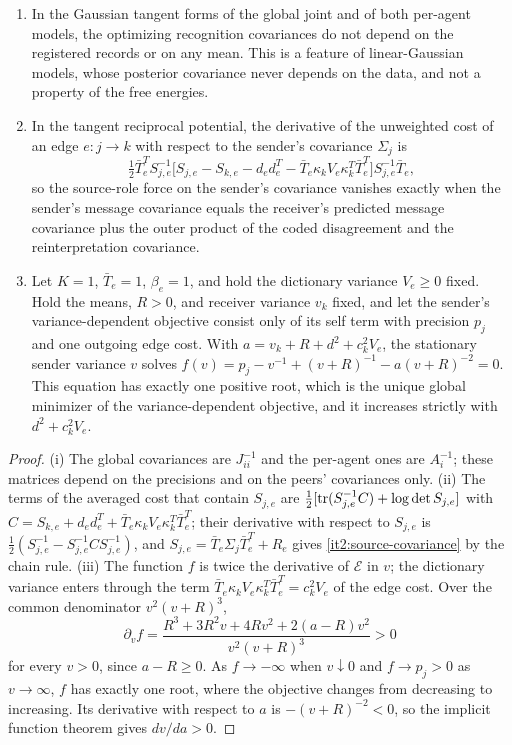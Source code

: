 \begin{enumerate}
\item[(i)] In the Gaussian tangent forms of the global joint and of both per-agent models, the optimizing recognition covariances do not depend on the registered records or on any mean. This is a feature of linear-Gaussian models, whose posterior covariance never depends on the data, and not a property of the free energies.
\item[(ii)] In the tangent reciprocal potential, the derivative of the unweighted cost of an edge $e:j\to k$ with respect to the sender's covariance $\Sigma_j$ is
\begin{equation}
\tfrac12\bar T_e^TS_{j,e}^{-1}\bigl[S_{j,e}-S_{k,e}-d_ed_e^T-\bar T_e\kappa_kV_e\kappa_k^T\bar T_e^T\bigr]S_{j,e}^{-1}\bar T_e,
\label{it2:source-covariance}
\end{equation}
so the source-role force on the sender's covariance vanishes exactly when the sender's message covariance equals the receiver's predicted message covariance plus the outer product of the coded disagreement and the reinterpretation covariance.
\item[(iii)] Let $K=1$, $\bar T_e=1$, $\beta_e=1$, and hold the dictionary variance $V_e\geq0$ fixed. Hold the means, $R>0$, and receiver variance $v_k$ fixed, and let the sender's variance-dependent objective consist only of its self term with precision $p_j$ and one outgoing edge cost. With $a=v_k+R+d^2+c_k^2V_e$, the stationary sender variance $v$ solves $f(v)=p_j-v^{-1}+(v+R)^{-1}-a(v+R)^{-2}=0$. This equation has exactly one positive root, which is the unique global minimizer of the variance-dependent objective, and it increases strictly with $d^2+c_k^2V_e$.
\end{enumerate}
\begin{proof}
(i) The global covariances are $J_{ii}^{-1}$ and the per-agent ones are $A_i^{-1}$; these matrices depend on the precisions and on the peers' covariances only. (ii) The terms of the averaged cost that contain $S_{j,e}$ are $\frac12[\operatorname{tr}(S_{j,e}^{-1}C)+\log\det S_{j,e}]$ with $C=S_{k,e}+d_ed_e^T+\bar T_e\kappa_kV_e\kappa_k^T\bar T_e^T$; their derivative with respect to $S_{j,e}$ is $\frac12(S_{j,e}^{-1}-S_{j,e}^{-1}CS_{j,e}^{-1})$, and $S_{j,e}=\bar T_e\Sigma_j\bar T_e^T+R_e$ gives \cref{it2:source-covariance} by the chain rule. (iii) The function $f$ is twice the derivative of $\mathcal E$ in $v$; the dictionary variance enters through the term $\bar T_e\kappa_kV_e\kappa_k^T\bar T_e^T=c_k^2V_e$ of the edge cost. Over the common denominator $v^2(v+R)^3$,
\begin{equation}
\partial_vf=\frac{R^3+3R^2v+4Rv^2+2(a-R)v^2}{v^2(v+R)^3}>0
\end{equation}
for every $v>0$, since $a-R\geq0$. As $f\to-\infty$ when $v\downarrow0$ and $f\to p_j>0$ as $v\to\infty$, $f$ has exactly one root, where the objective changes from decreasing to increasing. Its derivative with respect to $a$ is $-(v+R)^{-2}<0$, so the implicit function theorem gives $dv/da>0$.
\end{proof}

